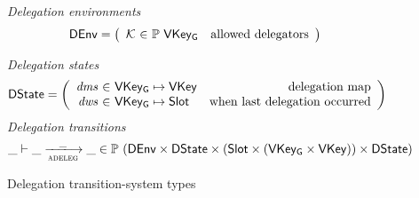 \begin{figure}[htb]
  \emph{Delegation environments}
  \begin{equation*}
    \DEnv =
    \left(
      \begin{array}{r@{~\in~}lr}
        \mathcal{K} & \powerset{\VKeyGen} & \text{allowed delegators}
      \end{array}
    \right)
  \end{equation*}

  \emph{Delegation states}
  \begin{align*}
    & \DState
      = \left(
        \begin{array}{r@{~\in~}lr}
          \var{dms} & \VKeyGen \mapsto \VKey & \text{delegation map}\\
          \var{dws} & \VKeyGen \mapsto \Slot & \text{when last delegation occurred}\\
        \end{array}\right)
  \end{align*}
  \emph{Delegation transitions}
  \begin{equation*}
    \_ \vdash \_ \trans{adeleg}{\_} \_ \in
    \powerset (\DEnv \times \DState \times (\Slot \times (\VKeyGen \times \VKey)) \times \DState)
    \end{equation*}
  \caption{Delegation transition-system types}
  \label{fig:ts-types:delegation}
\end{figure}

